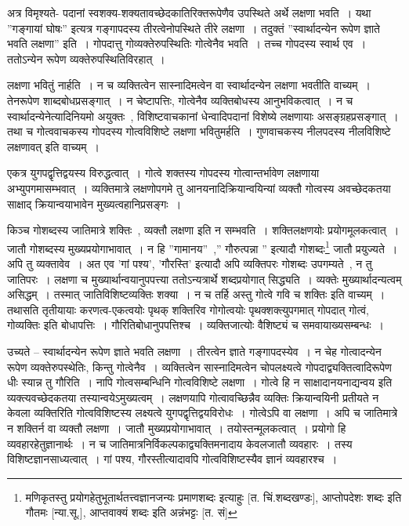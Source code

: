 				अत्र विमृश्यते- पदानां स्वशक्य-शक्यतावच्छेदकातिरिक्तरूपेणैव उपस्थिते अर्थे लक्षणा भवति~।  यथा ”गङ्गायां घोषः” इत्यत्र गङ्गापदस्य तीरत्वेनोपस्थिते तीरे लक्षणा~।  तदुक्तं ”स्वार्थादन्येन रूपेण  ज्ञाते भवति लक्षणा” इति~।  गोपदात्तु गोव्यक्तेरुपस्थितिः गोत्वेनैव भवति~।  तच्च गोपदस्य स्वार्थ एव~। ततोऽन्येन  रूपेण व्यक्तेरुपस्थितिविरहात्~।

				लक्षणा भवितुं नार्हति~। न च व्यक्तित्वेन सास्नादिमत्वेन वा स्वार्थादन्येन लक्षणा भवतीति वाच्यम्~।  तेनरूपेण शाब्दबोधप्रसङ्गात्~।  न चेष्टापत्तिः, गोत्वेनैव व्यक्तिबोधस्य आनुभविकत्वात्~।  न च स्वार्थादन्येनेत्यादिनियमो अयुक्तः~, विशिष्टवाचकानां धेन्वादिपदानां विशेष्ये लक्षणायाः असङ्ग्रहप्रसङ्गात्~।  तथा च गोत्ववाचकस्य  गोपदस्य गोत्वविशिष्टे लक्षणा भवितुमर्हति~।  गुणवाचकस्य नीलपदस्य नीलविशिष्टे लक्षणावत् इति वाच्यम्~। 

				एकत्र युगपद्वृत्तिद्वयस्य विरुद्धत्वात्~।  गोत्वे शक्तस्य गोपदस्य गोत्वान्तर्भावेण लक्षणाया अभ्युपगमासम्भवात्~।  व्यक्तिमात्रे लक्षणोपगमे तु  आनयनादिक्रियान्वयिन्यां व्यक्तौ गोत्वस्य अवच्छेदकतया साक्षाद् क्रियान्वयाभावेन मुख्यत्वहानिप्रसङ्गः~। 

				किञ्च गोशब्दस्य जातिमात्रे शक्तिः~, व्यक्तौ लक्षणा इति न सम्भवति~।  शक्तिलक्षणयोः प्रयोगमूलकत्वात्~।  जातौ गोशब्दस्य मुख्यप्रयोगाभावात्~।  न हि ”गामानय”~,” गौरुत्पन्ना ” इत्यादौ गोशब्दः\footnote{मणिकृतस्तु प्रयोगहेतुभूतार्थतत्त्वज्ञानजन्यः प्रमाणशब्दः इत्याहुः [त. चिं.शब्दखण्डः], आप्तोपदेशः शब्दः इति गौतमः [न्या.सू.], आप्तवाक्यं शब्दः इति अन्नंभट्टः [त. सं]} जातौ प्रयुज्यते~।  अपि तु व्यक्तावेव~।  अत एव ’गां पश्य’, ’गौरस्ति’ इत्यादौ अपि व्यक्तिपरः गोशब्दः उपगम्यते~, न तु जातिपरः~।  लक्षणा च मुख्यार्थान्वयानुपपत्त्या ततोऽन्यत्रार्थे शब्दप्रयोगात् सिद्ध्यति~।  व्यक्तेः मुख्यार्थादन्यत्वम् असिद्धम्~।  तस्मात् जातिविशिष्टव्यक्तिः शक्या~।  न च तर्हि अस्तु गोत्वे गवि च शक्तिः इति वाच्यम्~।  तथासति तृतीयायाः करणत्व-एकत्वयोः पृथक् शक्तिरिव गोगोत्वयोः पृथक्शक्त्युपगमात् गोपदात् गोत्वं, गोव्यक्तिः इति बोधापत्तिः~।  गौरितिबोधानुपपत्तिश्च~।  व्यक्तिजात्योः वैशिष्ट्यं च समवायाख्यसम्बन्धः~।

				\begin{small}
				
					उच्यते – स्वार्थादन्येन रूपेण ज्ञाते भवति लक्षणा~। तीरत्वेन ज्ञाते गङ्गापदस्येव~। न चेह गोत्वादन्येन रूपेण व्यक्तेरुपस्थेतिः, किन्तु गोत्वेनैव~। व्यक्तित्वेन सास्नादिमत्वेन चोपलक्ष्यत्वे गोपदाद्व्यक्तित्वादिरूपेण धीः स्यान्न तु गौरिति~। नापि गोत्वसम्बन्धिनि गोत्वविशिष्टे लक्षणा~। गोत्वे हि न साक्षादानयनाद्यन्वय इति व्यक्त्यवच्छेदकतया तस्यान्वयेऽमुख्यत्वम्~। लक्षणयापि गोत्वावच्छिन्नैव व्यक्तिः क्रियान्वयिनी प्रतीयते न केवला व्यक्तिरिति गोत्वविशिष्टस्य लक्ष्यत्वे युगपद्वृत्तिद्वयविरोधः~। गोत्वेऽपि वा लक्षणा~। अपि च जातिमात्रे न शक्तिर्न वा व्यक्तौ लक्षणा~। जातौ मुख्यप्रयोगाभावात्~। तयोस्तन्मूलकत्वात्~। प्रयोगो हि व्यवहारहेतुज्ञानार्थः~। न च जातिमात्रनिर्विकल्पकाद्व्यक्तिमनादाय केवलजातौ व्यवहारः~। तस्य विशिष्टज्ञानसाध्यत्वात्~। गां पश्य, गौरस्तीत्यादावपि गोत्वविशिष्टस्यैव ज्ञानं व्यवहारश्च~।
				\end{small}

